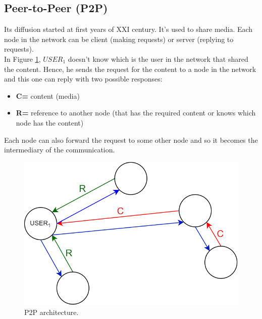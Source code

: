 \subsection{Peer-to-Peer (P2P)}
Its diffusion started at first years of XXI century. It's used to share media. Each node in the network can be client (making requests) or server (replying to requests).\\
In Figure \ref{p2p}, $USER_1$ doesn't know which is the user in the network that shared the content. Hence, he sends the request for the content to a node in the network and this one can reply with two possible responses:
\begin{itemize}
\item{\textbf{C=} content (media)}
\item{\textbf{R=} reference to another node (that has the required content or knows which node has the content)}
\end{itemize}
Each node can also forward the request to some other node and so it becomes the intermediary of the communication.
\begin{figure}[h]
\centering
\includegraphics[scale=0.35]{Images/OSI/p2p}
\caption{\footnotesize{P2P architecture.\\}}\label{p2p}
\end{figure}

